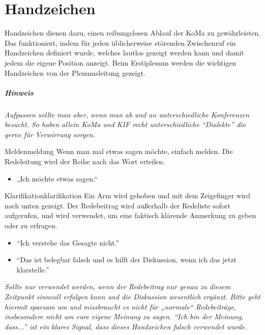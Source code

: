 \chapter{Handzeichen}\label{sec:handzeichen}


Handzeichen dienen dazu, einen reibungslosen Ablauf der KoMa zu gewährleisten.
Das funktioniert, indem für jeden üblicherweise störenden Zwischenruf ein Handzeichen definiert wurde, welches lautlos gezeigt werden kann und damit jedem die eigene Position anzeigt.
Beim Erstiplenum werden die wichtigen Handzeichen von der Plenumsleitung gezeigt.

\paragraph{Hinweis} \emph{Aufpassen sollte man aber, wenn man ab und an unterschiedliche Konferenzen besucht. So haben allein KoMa und KIF recht unterschiedliche \enquote{Dialekte} die gerne für Verwirrung sorgen.} %

\begin{handzeichen}[.2\linewidth]{Melden}{meldung}
Wenn man mal etwas sagen möchte, einfach melden. Die Redeleitung wird der Reihe nach das Wort erteilen.
\begin{itemize}
	\item „Ich möchte etwas sagen.“
\end{itemize}
\end{handzeichen}

\begin{handzeichen}{Klarifikation}{klarifikation}
	Ein Arm wird gehoben und mit dem Zeigefinger wird nach unten gezeigt.
	Der Redebeitrag wird außerhalb der Redeliste sofort aufgerufen, und wird verwendet, um eine faktisch klärende Anmerkung zu geben oder zu erfragen.
	\begin{itemize}
		\item \enquote{Ich verstehe das Gesagte nicht.}
		\item \enquote{Das ist belegbar falsch und es hilft der Diskussion, wenn ich das jetzt klarstelle.}
	\end{itemize}
\end{handzeichen}

\emph{Sollte nur verwendet werden, wenn der Redebeitrag nur genau zu diesem Zeitpunkt sinnvoll erfolgen kann und die Diskussion wesentlich ergänzt. Bitte geht hiermit sparsam um und missbraucht es nicht für „normale“ Redebeiträge, insbesondere nicht um eure eigene Meinung zu sagen. \enquote{Ich bin der Meinung, dass...} ist ein klares Signal, dass dieses Handzeichen falsch verwendet wurde.
}

